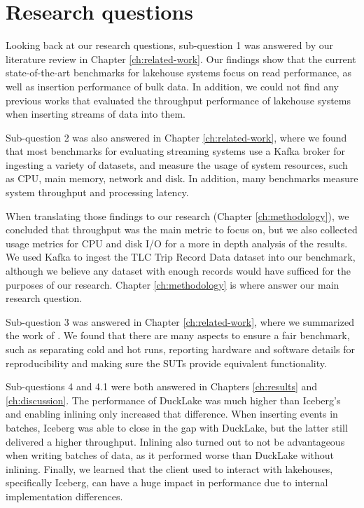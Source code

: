 \section{Research questions}
Looking back at our research questions, sub-question 1 was answered by our literature review in Chapter \ref{ch:related-work}. Our findings show that the current state-of-the-art benchmarks for lakehouse systems focus on read performance, as well as insertion performance of bulk data. In addition, we could not find any previous works that evaluated the throughput performance of lakehouse systems when inserting streams of data into them.

Sub-question 2 was also answered in Chapter \ref{ch:related-work}, where we found that most benchmarks for evaluating streaming systems use a Kafka broker for ingesting a variety of datasets, and measure the usage of system resources, such as CPU, main memory, network and disk. In addition, many benchmarks measure system throughput and processing latency. 

When translating those findings to our research (Chapter \ref{ch:methodology}), we concluded that throughput was the main metric to focus on, but we also collected usage metrics for CPU and disk I/O for a more in depth analysis of the results. We used Kafka to ingest the TLC Trip Record Data dataset into our benchmark, although we believe any dataset with enough records would have sufficed for the purposes of our research. Chapter \ref{ch:methodology} is where answer our main research question.

Sub-question 3 was answered in Chapter \ref{ch:related-work}, where we summarized the work of \citeauthor{raasveldtFairBenchmarkingConsidered2018} \cite{raasveldtFairBenchmarkingConsidered2018}. We found that there are many aspects to ensure a fair benchmark, such as separating cold and hot runs, reporting hardware and software details for reproducibility and making sure the SUTs provide equivalent functionality.

Sub-questions 4 and 4.1 were both answered in Chapters \ref{ch:results} and \ref{ch:discussion}. The performance of DuckLake was much higher than Iceberg's and enabling inlining only increased that difference. When inserting events in batches, Iceberg was able to close in the gap with DuckLake, but the latter still delivered a higher throughput. Inlining also turned out to not be advantageous when writing batches of data, as it performed worse than DuckLake without inlining. Finally, we learned that the client used to interact with lakehouses, specifically Iceberg, can have a huge impact in performance due to internal implementation differences.

